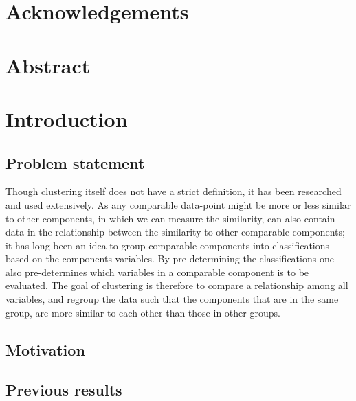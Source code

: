 \documentclass[a4paper, 12pt]{article}
\begin{document}
    

    \section*{Acknowledgements}
    \newpage

    \tableofcontents
    \newpage




    \section{Abstract}

    \section{Introduction}
    \subsection{Problem statement}
	Though clustering itself does not have a strict definition, it has been researched and used extensively. As any comparable data-point might be more or less similar to other components, in which we can measure the similarity, can also contain data in the relationship between the similarity to other comparable components; it has long been an idea to group comparable components into classifications based on the components variables. By pre-determining the classifications one also pre-determines which variables in a comparable component is to be evaluated. The goal of clustering is therefore to compare a relationship among all variables, and regroup 	the data such that the components that are in the same group, are more similar to each other than those in other groups. \cite{gan07}
    \subsection{Motivation}
    \subsection{Previous results}
    
\end{document}
